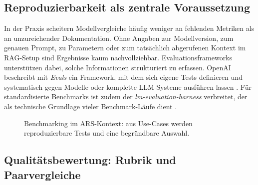 \subsection{Reproduzierbarkeit als zentrale Voraussetzung}

In der Praxis scheitern Modellvergleiche häufig weniger an fehlenden Metriken als an unzureichender Dokumentation. Ohne Angaben zur Modellversion, zum genauen Prompt, zu Parametern oder zum tatsächlich abgerufenen Kontext im RAG-Setup sind Ergebnisse kaum nachvollziehbar. Evaluationsframeworks unterstützen dabei, solche Informationen strukturiert zu erfassen. OpenAI beschreibt mit \emph{Evals} ein Framework, mit dem sich eigene Tests definieren und systematisch gegen Modelle oder komplette LLM-Systeme ausführen lassen \parencite{openai-evals,openai-evals-cookbook}. Für standardisierte Benchmarks ist zudem der \emph{lm-evaluation-harness} verbreitet, der als technische Grundlage vieler Benchmark-Läufe dient \parencite{lm-eval-harness}.

\begin{figure}[t]
\centering
{}
\caption{Benchmarking im ARS-Kontext: aus Use-Cases werden reproduzierbare Tests und eine begründbare Auswahl.}
\label{fig:workflow}
\end{figure}

\subsection{Qualitätsbewertung: Rubrik und Paarvergleiche}

